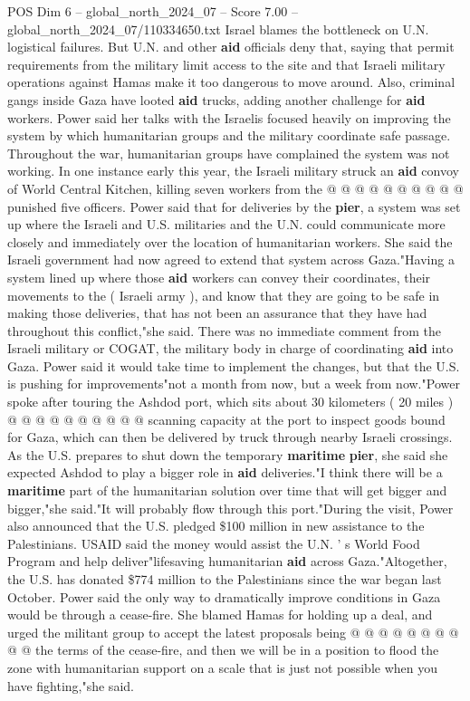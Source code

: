 \begin{textsample}{POS Dim 6 – global\_north\_2024\_07 – Score 7.00 – global\_north\_2024\_07/110334650.txt}
Israel blames the bottleneck on U.N. logistical failures.
But U.N. and other \textbf{aid} officials deny that, saying that permit requirements from the military limit access to the site and that Israeli military operations against Hamas make it too dangerous to move around.
Also, criminal gangs inside Gaza have looted \textbf{aid} trucks, adding another challenge for \textbf{aid} workers.
Power said her talks with the Israelis focused heavily on improving the system by which humanitarian groups and the military coordinate safe passage.
Throughout the war, humanitarian groups have complained the system was not working.
In one instance early this year, the Israeli military struck an \textbf{aid} convoy of World Central Kitchen, killing seven workers from the @ @ @ @ @ @ @ @ @ @ punished five officers.
Power said that for deliveries by the \textbf{pier}, a system was set up where the Israeli and U.S. militaries and the U.N. could communicate more closely and immediately over the location of humanitarian workers.
She said the Israeli government had now agreed to extend that system across Gaza."Having a system lined up where those \textbf{aid} workers can convey their coordinates, their movements to the ( Israeli army ), and know that they are going to be safe in making those deliveries, that has not been an assurance that they have had throughout this conflict,"she said.
There was no immediate comment from the Israeli military or COGAT, the military body in charge of coordinating \textbf{aid} into Gaza.
Power said it would take time to implement the changes, but that the U.S. is pushing for improvements"not a month from now, but a week from now."Power spoke after touring the Ashdod port, which sits about 30 kilometers ( 20 miles ) @ @ @ @ @ @ @ @ @ @ scanning capacity at the port to inspect goods bound for Gaza, which can then be delivered by truck through nearby Israeli crossings.
As the U.S. prepares to shut down the temporary \textbf{maritime} \textbf{pier}, she said she expected Ashdod to play a bigger role in \textbf{aid} deliveries."I think there will be a \textbf{maritime} part of the humanitarian solution over time that will get bigger and bigger,"she said."It will probably flow through this port."During the visit, Power also announced that the U.S. pledged \$100 million in new assistance to the Palestinians.
USAID said the money would assist the U.N. ' s World Food Program and help deliver"lifesaving humanitarian \textbf{aid} across Gaza."Altogether, the U.S. has donated \$774 million to the Palestinians since the war began last October.
Power said the only way to dramatically improve conditions in Gaza would be through a cease-fire.
She blamed Hamas for holding up a deal, and urged the militant group to accept the latest proposals being @ @ @ @ @ @ @ @ @ @ the terms of the cease-fire, and then we will be in a position to flood the zone with humanitarian support on a scale that is just not possible when you have fighting,"she said.

\end{textsample}
